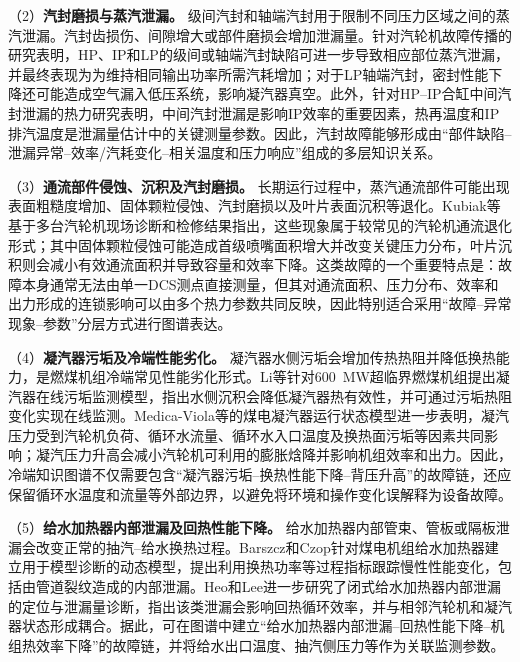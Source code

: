 （2）\textbf{汽封磨损与蒸汽泄漏。} 级间汽封和轴端汽封用于限制不同压力区域之间的蒸汽泄漏。汽封齿损伤、间隙增大或部件磨损会增加泄漏量。针对汽轮机故障传播的研究表明，HP、IP和LP的级间或轴端汽封缺陷可进一步导致相应部位蒸汽泄漏，并最终表现为为维持相同输出功率所需汽耗增加；对于LP轴端汽封，密封性能下降还可能造成空气漏入低压系统，影响凝汽器真空\cite{ZhangHu2021FaultPropagationGNN}。此外，针对HP--IP合缸中间汽封泄漏的热力研究表明，中间汽封泄漏是影响IP效率的重要因素，热再温度和IP排汽温度是泄漏量估计中的关键测量参数\cite{Xu2011HPIPLeakage}。因此，汽封故障能够形成由“部件缺陷--泄漏异常--效率/汽耗变化--相关温度和压力响应”组成的多层知识关系。

（3）\textbf{通流部件侵蚀、沉积及汽封磨损。} 长期运行过程中，蒸汽通流部件可能出现表面粗糙度增加、固体颗粒侵蚀、汽封磨损以及叶片表面沉积等退化。Kubiak等基于多台汽轮机现场诊断和检修结果指出，这些现象属于较常见的汽轮机通流退化形式；其中固体颗粒侵蚀可能造成首级喷嘴面积增大并改变关键压力分布，叶片沉积则会减小有效通流面积并导致容量和效率下降\cite{Kubiak2002TurbineDegradation,Kubiak2002ScaleDeposit}。这类故障的一个重要特点是：故障本身通常无法由单一DCS测点直接测量，但其对通流面积、压力分布、效率和出力形成的连锁影响可以由多个热力参数共同反映，因此特别适合采用“故障--异常现象--参数”分层方式进行图谱表达。

（4）\textbf{凝汽器污垢及冷端性能劣化。} 凝汽器水侧污垢会增加传热热阻并降低换热能力，是燃煤机组冷端常见性能劣化形式。Li等针对600~MW超临界燃煤机组提出凝汽器在线污垢监测模型，指出水侧沉积会降低凝汽器热有效性，并可通过污垢热阻变化实现在线监测\cite{Li2016CondenserFouling}。Medica-Viola等的煤电凝汽器运行状态模型进一步表明，凝汽压力受到汽轮机负荷、循环水流量、循环水入口温度及换热面污垢等因素共同影响；凝汽压力升高会减小汽轮机可利用的膨胀焓降并影响机组效率和出力\cite{Medica2018CondenserCondition}。因此，冷端知识图谱不仅需要包含“凝汽器污垢--换热性能下降--背压升高”的故障链，还应保留循环水温度和流量等外部边界，以避免将环境和操作变化误解释为设备故障。

（5）\textbf{给水加热器内部泄漏及回热性能下降。} 给水加热器内部管束、管板或隔板泄漏会改变正常的抽汽--给水换热过程。Barszcz和Czop针对煤电机组给水加热器建立用于模型诊断的动态模型，提出利用换热功率等过程指标跟踪慢性性能变化，包括由管道裂纹造成的内部泄漏\cite{Barszcz2011FeedwaterHeater}。Heo和Lee进一步研究了闭式给水加热器内部泄漏的定位与泄漏量诊断，指出该类泄漏会影响回热循环效率，并与相邻汽轮机和凝汽器状态形成耦合\cite{Heo2012FWHLeakage}。据此，可在图谱中建立“给水加热器内部泄漏--回热性能下降--机组热效率下降”的故障链，并将给水出口温度、抽汽侧压力等作为关联监测参数。

